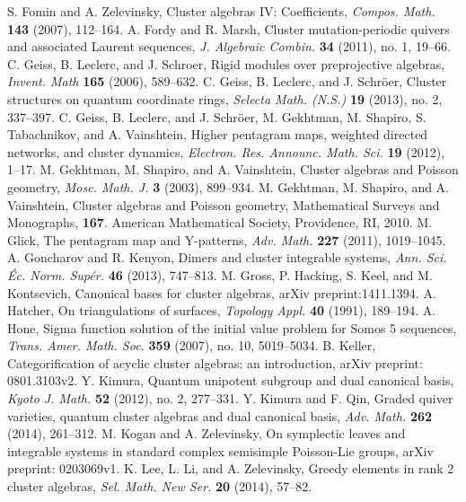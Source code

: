 \documentclass{amsart}
\theoremstyle{definition}
\theoremstyle{remark}
\numberwithin{equation}{section}
\begin{document}
\begin{thebibliography}{99}
	 S. Fomin and A. Zelevinsky, Cluster algebras IV: Coefficients, \textsl{Compos. Math.} \textbf{143} (2007), 112--164.
	 A. Fordy and R. Marsh, Cluster mutation-periodic quivers and associated Laurent sequences, \textsl{J. Algebraic Combin.} \textbf{34} (2011), no. 1, 19--66.
	 C. Geiss, B. Leclerc, and J. Schroer, Rigid modules over preprojective algebras, \textsl{Invent. Math} \textbf{165} (2006), 589--632.
   C. Geiss, B. Leclerc, and J. Schr\"oer, Cluster structures on quantum coordinate rings, \textsl{Selecta Math. (N.S.)} \textbf{19} (2013), no. 2, 337--397.
   C. Geiss, B. Leclerc, and J. Schr\"oer,
	 M. Gekhtman, M. Shapiro, S. Tabachnikov, and A. Vainshtein, Higher pentagram maps, weighted directed networks, and cluster dynamics, \textsl{Electron. Res. Announc. Math. Sci.} \textbf{19} (2012), 1--17.
	 M. Gekhtman, M. Shapiro, and A. Vainshtein,  Cluster algebras and Poisson geometry, \textsl{Mosc. Math. J.} \textbf{3} (2003), 899--934.
   M. Gekhtman, M. Shapiro, and A. Vainshtein,  Cluster algebras and Poisson geometry, Mathematical Surveys and Monographs, \textbf{167}. American Mathematical Society, Providence, RI, 2010.
	 M. Glick, The pentagram map and Y-patterns, \textsl{Adv. Math.} \textbf{227} (2011), 1019--1045.
	 A. Goncharov and R. Kenyon, Dimers and cluster integrable systems, \textsl{Ann. Sci. \'Ec. Norm. Sup\'er.} \textbf{46} (2013), 747--813.
   M. Gross, P. Hacking, S. Keel, and M. Kontsevich, Canonical bases for cluster algebras, arXiv preprint:1411.1394.
	 A. Hatcher, On triangulations of surfaces, \textsl{Topology Appl.} \textbf{40} (1991), 189--194.
	 A. Hone, Sigma function solution of the initial value problem for Somos 5 sequences, \textsl{Trans. Amer. Math. Soc.} \textbf{359} (2007), no. 10, 5019--5034.
   B. Keller, Categorification of acyclic cluster algebras: an introduction, arXiv preprint: 0801.3103v2.
   Y. Kimura, Quantum unipotent subgroup and dual canonical basis, \textsl{Kyoto J. Math.} \textbf{52} (2012), no. 2, 277--331.
   Y. Kimura and F. Qin, Graded quiver varieties, quantum cluster algebras and dual canonical basis, \textsl{Adv. Math.} \textbf{262} (2014), 261--312.
   M. Kogan and A. Zelevinsky, On symplectic leaves and integrable systems in standard complex semisimple Poisson-Lie groups, arXiv preprint: 0203069v1.
   K. Lee, L. Li, and A. Zelevinsky, Greedy elements in rank 2 cluster algebras, \textsl{Sel. Math. New Ser.} \textbf{20} (2014), 57--82.

\end{thebibliography}
\end{document}
